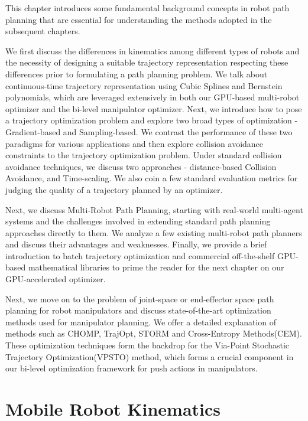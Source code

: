 This chapter introduces some fundamental background concepts in robot path planning that are essential for understanding the methods adopted in the subsequent chapters.

We first discuss the differences in kinematics among different types of robots and the necessity of designing a suitable trajectory representation respecting these differences prior to formulating a path planning problem. We talk about continuous-time trajectory representation using Cubic Splines and Bernstein polynomials, which are leveraged extensively in both our GPU-based multi-robot optimizer and the bi-level manipulator optimizer. Next, we introduce how to pose a trajectory optimization problem and explore two broad types of optimization - Gradient-based and Sampling-based. We contrast the performance of these two paradigms for various applications and then explore collision avoidance constraints to the trajectory optimization problem. Under standard collision avoidance techniques, we discuss two approaches - distance-based Collision Avoidance, and Time-scaling. We also coin a few standard evaluation metrics for judging the quality of a trajectory planned by an optimizer.

Next, we discuss Multi-Robot Path Planning, starting with real-world multi-agent systems and the challenges involved in extending standard path planning approaches directly to them. We analyze a few existing multi-robot path planners and discuss their advantages and weaknesses. Finally, we provide a brief introduction to batch trajectory optimization and commercial off-the-shelf GPU-based mathematical libraries to prime the reader for the next chapter on our GPU-accelerated optimizer.

Next, we move on to the problem of joint-space or end-effector space path planning for robot manipulators and discuss state-of-the-art optimization methods used for manipulator planning. We offer a detailed explanation of methods such as CHOMP\cite{CHOMP}, TrajOpt\cite{TrajOpt}, STORM\cite{STORM} and Cross-Entropy Methods(CEM)\cite{iCEM}. These optimization techniques form the backdrop for the Via-Point Stochastic Trajectory Optimization(VPSTO)\cite{VPSTO} method, which forms a crucial component in our bi-level optimization framework for push actions in manipulators.

\section{Mobile Robot Kinematics}

